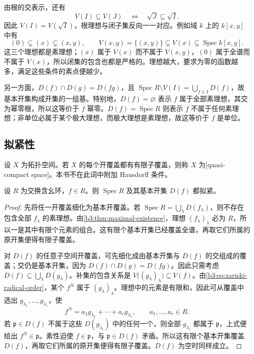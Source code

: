 \ProseParagraphBreak
由根的交表示，还有
\begin{equation}\label{b3:eq:zariski-radical-order}
	V(I)\subseteq V(J)\quad\Longleftrightarrow\quad \sqrt J\subseteq\sqrt I.
\end{equation}
因此 \(V(I)=V(\sqrt I)\)，根理想与闭子集反向一一对应。例如域 \(k\) 上的 \(k[x,y]\) 中有
\[
	(0)\subsetneq(x)\subsetneq(x,y),\qquad V(x,y)=\{(x,y)\}\subsetneq V(x)\subsetneq\operatorname{Spec}k[x,y].
\]
这三个理想都是素理想；\((x)\) 属于 \(V(x)\) 而不属于 \(V(x,y)\)，\((0)\) 属于全谱而不属于 \(V(x)\)，所以闭集的包含也都是严格的。理想越大，要求为零的函数越多，满足这些条件的素点便越少。

\ProseParagraphBreak
另一方面，\(D(f)\cap D(g)=D(fg)\)，且 \(\operatorname{Spec}R\setminus V(I)=\bigcup_{f\in I}D(f)\)，故基本开集构成开集的一组基。特别地，\(D(f)=\varnothing\) 表示 \(f\) 属于全部素理想，其交为幂零根，所以这等价于 \(f\) 幂零。\(D(f)=\operatorname{Spec}R\) 则表示 \(f\) 不属于任何素理想；非单位必属于某个极大理想，而极大理想是素理想，故这等价于 \(f\) 是单位。

\subsection{拟紧性}
\label{b3:subsec:0103:02}

设 \(X\) 为拓扑空间。若 \(X\) 的每个开覆盖都有有限子覆盖，则称 \(X\) 为[quasi-compact space]。本书不在此词中附加 Hausdorff 条件。

\begin{proposition}\label{b3:prop:spec-quasicompact}
	设 \(R\) 为交换含幺环，\(f\in R\)。则 \(\operatorname{Spec}R\) 及其基本开集 \(D(f)\) 都拟紧。
\end{proposition}
\begin{proof}
	先将任一开覆盖细化为基本开覆盖。若 \(\operatorname{Spec}R=\bigcup_\lambda D(f_\lambda)\)，则不存在包含全部 \(f_\lambda\) 的素理想。由\cref{b3:thm:maximal-existence}，理想 \((f_\lambda)_\lambda\) 必为 \(R\)，所以一是其中有限个元素的组合。这有限个基本开集已经覆盖全谱，再取它们所属的原开集便得有限子覆盖。

	对 \(D(f)\) 的任意子空间开覆盖，可先细化成由基本开集与 \(D(f)\) 的交组成的覆盖；交仍是基本开集，因为 \(D(f)\cap D(g)=D(fg)\)。因此只需考虑 \(D(f)\subseteq\bigcup_\lambda D(g_\lambda)\)。补集的包含关系是 \(V\bigl((g_\lambda)_\lambda\bigr)\subseteq V(f)\)。由\eqref{b3:eq:zariski-radical-order}，某个 \(f^N\) 属于 \((g_\lambda)_\lambda\)。理想中的元素是有限和，因此可从覆盖中选出 \(g_{\lambda_1},\ldots,g_{\lambda_r}\)，使
	\[
		f^N=a_1g_{\lambda_1}+\cdots+a_rg_{\lambda_r},\qquad a_1,\ldots,a_r\in R.
	\]
	若 \(\mathfrak p\in D(f)\) 不属于这些 \(D(g_{\lambda_i})\) 中的任何一个，则全部 \(g_{\lambda_i}\) 都属于 \(\mathfrak p\)，上式便给出 \(f^N\in\mathfrak p\)。素性迫使 \(f\in\mathfrak p\)，与 \(\mathfrak p\in D(f)\) 矛盾。所以这有限个基本开集覆盖 \(D(f)\)，再取它们所属的原开集便得有限子覆盖。\(D(f)\) 为空时同样成立。
\end{proof}

